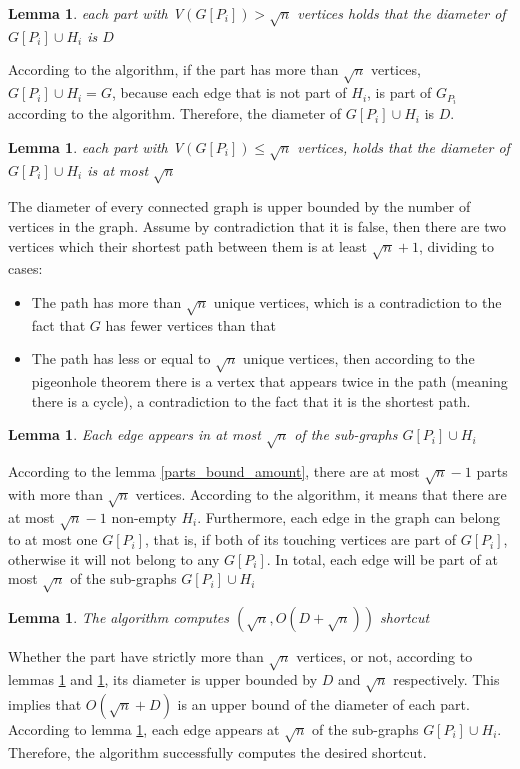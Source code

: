 \documentclass[11pt]{article}
\newtheorem{lemma}[theorem]{Lemma}
\begin{document}
\begin{lemma}
\label{parts_dimater_D}
each part with {\Large V}$(G[P_i]) > \sqrt{n}$ vertices holds that the diameter of $G[P_i] \cup H_i$ is $D$
\end{lemma}
According to the algorithm, if the part has more than $\sqrt{n}$ vertices, $G[P_i] \cup H_i = G$, because each edge that is not part of $H_i$, is part of $G_{P_{i}}$ according to the algorithm. Therefore, the diameter of $G[P_i] \cup H_i$ is $D$.

\begin{lemma}
\label{parts_dimater_sqrt_n}
each part with {\Large V}$(G[P_i]) \le \sqrt{n}$ vertices, holds that the diameter of $G[P_i] \cup H_i$ is at most $\sqrt{n}$
\end{lemma}
The diameter of every connected graph is upper bounded by the number of vertices in the graph. Assume by contradiction that it is false, then there are two vertices which their shortest path between them is at least $\sqrt{n} +1$, dividing to cases:
\begin{itemize}
    \item The path has more than $\sqrt{n}$ unique vertices, which is a contradiction to the fact that $G$ has fewer vertices than that
    \item The path has less or equal to $\sqrt{n}$ unique vertices, then according to the pigeonhole theorem there is a vertex that appears twice in the path (meaning there is a cycle), a contradiction to the fact that it is the shortest path. 
\end{itemize}


\begin{lemma}
\label{edges_bound}
Each edge appears in at most $\sqrt{n}$ of the sub-graphs $G[P_i] \cup H_i$
\end{lemma}
According to the lemma \ref{parts_bound_amount}, there are at most $\sqrt{n} -1$ parts with more than $\sqrt{n}$ vertices. According to the algorithm, it means that there are at most $\sqrt{n}-1$ non-empty $H_i$. Furthermore, each edge in the graph can belong to at most one $G[P_i]$, that is, if both of its touching vertices are part of $G[P_i]$, otherwise it will not belong to any $G[P_i]$.
In total, each edge will be part of at most $\sqrt{n}$ of the sub-graphs $G[P_i] \cup H_i$

\begin{lemma} The algorithm computes $(\sqrt{n}, O(D + \sqrt{n}) )$ shortcut
\end{lemma}
Whether the part have strictly more than $\sqrt{n}$ vertices, or not, according to lemmas \ref{parts_dimater_D} and \ref{parts_dimater_sqrt_n}, its diameter is upper bounded by $D$ and $\sqrt{n}$ respectively. This implies that $O(\sqrt{n} +D)$ is an upper bound of the diameter of each part. According to lemma \ref{edges_bound}, each edge appears at $\sqrt{n}$ of the sub-graphs $G[P_i] \cup H_i$. Therefore, the algorithm successfully computes the desired shortcut.
\end{document}
